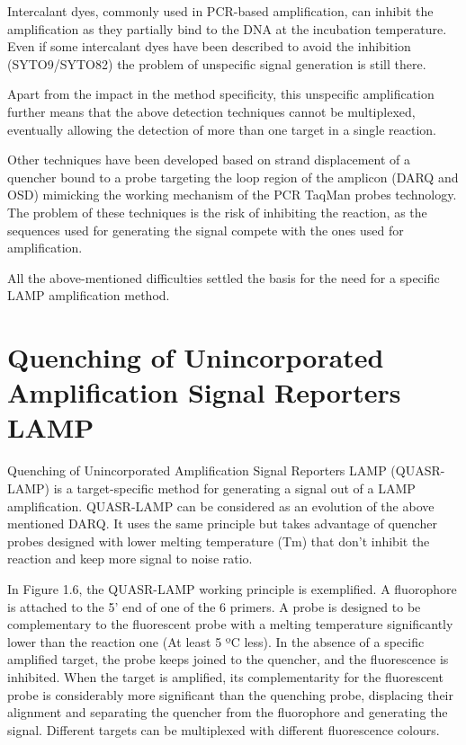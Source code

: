 Intercalant dyes, commonly used in PCR-based amplification, can inhibit the amplification as they partially bind to the DNA at the incubation temperature. Even if some intercalant dyes have been described to avoid the inhibition (SYTO9/SYTO82)\cite{oscorbin_comparison_2016} the problem of unspecific signal generation is still there.

Apart from the impact in the method specificity, this unspecific amplification  further means that the above detection techniques cannot be multiplexed, eventually allowing the detection of more than one target in a single reaction. 

Other techniques have been developed based on strand displacement of a quencher bound to a probe targeting the loop region of the amplicon (DARQ\cite{tanner_simultaneous_2012} and OSD\cite{bhadra_high-surety_2020}) mimicking the working mechanism of the PCR TaqMan probes technology. The problem of these techniques is the risk of inhibiting the reaction, as the sequences used for generating the signal compete with the ones used for amplification\cite{ball_quenching_2016}.

All the above-mentioned difficulties settled the basis for the need for a specific LAMP amplification method.

\section{Quenching of Unincorporated Amplification Signal Reporters LAMP}

Quenching of Unincorporated Amplification Signal Reporters LAMP (QUASR-LAMP) is a target-specific method for generating a signal out of a LAMP amplification. QUASR-LAMP can be considered as an evolution of the above mentioned DARQ. It uses the same principle but takes advantage of quencher probes designed with lower melting temperature (Tm) that don't inhibit the reaction and keep more signal to noise ratio\cite{ball_quenching_2016}.

In Figure 1.6, the QUASR-LAMP working principle is exemplified. A fluorophore is attached to the 5' end of one of the 6 primers. A probe is designed to be complementary to the fluorescent probe with a melting temperature significantly lower than the reaction one (At least 5 ºC less)\cite{ball_quenching_2016}. In the absence of a specific amplified target, the probe keeps joined to the quencher, and the fluorescence is inhibited. When the target is amplified, its complementarity for the fluorescent probe is considerably more significant than the quenching probe, displacing their alignment and separating the quencher from the fluorophore and generating the signal. Different targets can be multiplexed with different fluorescence colours.

